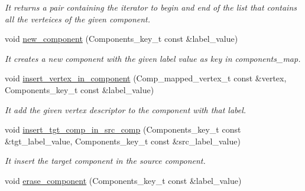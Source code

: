 \begin{DoxyCompactItemize}
\begin{DoxyCompactList}\small\item\em It returns a pair containing the iterator to begin and end of the list that contains all the verteices of the given component. \item\end{DoxyCompactList}\item 
\hypertarget{classour__disjoint__sets_aed72004f9bb740900d04c6a91ca4f387}{
void \hyperlink{classour__disjoint__sets_aed72004f9bb740900d04c6a91ca4f387}{new\_\-component} (Components\_\-key\_\-t const \&label\_\-value)}
\label{classour__disjoint__sets_aed72004f9bb740900d04c6a91ca4f387}

\begin{DoxyCompactList}\small\item\em It creates a new component with the given label value as key in components\_\-map. \item\end{DoxyCompactList}\item 
\hypertarget{classour__disjoint__sets_a2a61ff9747e26252f73af33c07de5abe}{
void \hyperlink{classour__disjoint__sets_a2a61ff9747e26252f73af33c07de5abe}{insert\_\-vertex\_\-in\_\-component} (Comp\_\-mapped\_\-vertex\_\-t const \&vertex, Components\_\-key\_\-t const \&label\_\-value)}
\label{classour__disjoint__sets_a2a61ff9747e26252f73af33c07de5abe}

\begin{DoxyCompactList}\small\item\em It add the given vertex descriptor to the component with that label. \item\end{DoxyCompactList}\item 
\hypertarget{classour__disjoint__sets_a44dcc3863e7c535c069b3334013a3d4d}{
void \hyperlink{classour__disjoint__sets_a44dcc3863e7c535c069b3334013a3d4d}{insert\_\-tgt\_\-comp\_\-in\_\-src\_\-comp} (Components\_\-key\_\-t const \&tgt\_\-label\_\-value, Components\_\-key\_\-t const \&src\_\-label\_\-value)}
\label{classour__disjoint__sets_a44dcc3863e7c535c069b3334013a3d4d}

\begin{DoxyCompactList}\small\item\em It insert the target component in the source component. \item\end{DoxyCompactList}\item 
\hypertarget{classour__disjoint__sets_a764c4140923146365e4735876e88b023}{
void \hyperlink{classour__disjoint__sets_a764c4140923146365e4735876e88b023}{erase\_\-component} (Components\_\-key\_\-t const \&label\_\-value)}
\label{classour__disjoint__sets_a764c4140923146365e4735876e88b023}


\end{DoxyCompactItemize}
